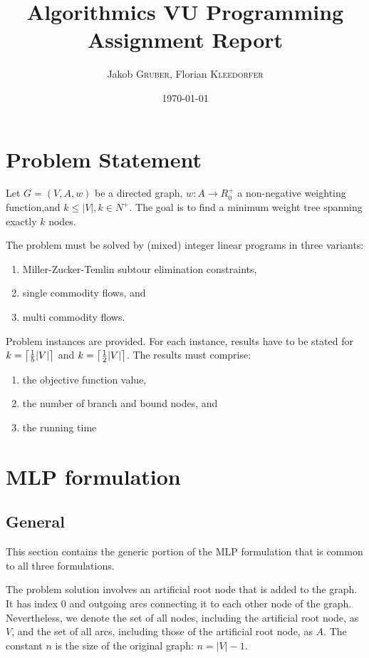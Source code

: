 \documentclass{article}
\title{Algorithmics VU Programming Assignment Report} %
\author{Jakob \textsc{Gruber}, Florian \textsc{Kleedorfer}} %
\date{\today} %
\DeclarePairedDelimiter{\ceil}{\lceil}{\rceil}
\begin{document}
\maketitle %

\section{Problem Statement}

Let $G=(V,A,w)$ be a directed graph, $w: A \rightarrow R_0^+$ a non-negative weighting function,and $k \leq |V|, k \in N^+$. The goal is to find a minimum weight tree spanning exactly $k$ nodes.

The problem must be solved by (mixed) integer linear programs in three variants:
\begin{enumerate}
	\item Miller-Zucker-Temlin subtour elimination constraints,
	\item single commodity flows, and
	\item multi commodity flows.
\end{enumerate}
Problem instances are provided. For each instance, results have to be stated for $k = \ceil[\big]{\frac{1}{5}|V|}$ and  $k = \ceil[\big]{\frac{1}{2}|V|}$. The results must comprise:
\begin{enumerate}
\item the objective function value,
\item the number of branch and bound nodes, and
\item the running time
\end{enumerate}

\section{MLP formulation} 
\subsection{General}
This section contains the generic portion of the MLP formulation that is common to all three formulations.

The problem solution involves an artificial root node that is added to the graph. It has index 0 and outgoing arcs connecting it to each other node of the graph. Nevertheless, we denote the set of all nodes, including the artificial root node, as $V$, and the set of all arcs, including those of the artificial root node, as $A$. The constant $n$ is the size of the original graph: $n = |V| - 1$.
\end{document}
